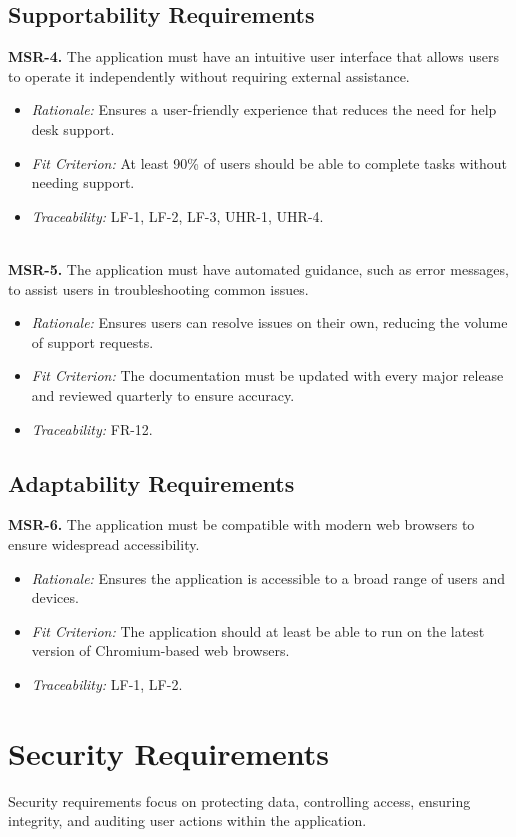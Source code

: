 \documentclass[12pt]{article}
\begin{document}
\subsection{Supportability Requirements}
\textbf{MSR-4.} The application must have an intuitive user interface that allows users to
  operate it independently without requiring external assistance.
  \begin{itemize}
    \item \textit{Rationale:} Ensures a user-friendly experience that reduces
    the need for help desk support.
    \item \textit{Fit Criterion:} At least 90\% of users should be able to
    complete tasks without needing support.
    \item \textit{Traceability:} LF-1, LF-2, LF-3, UHR-1, UHR-4.
  \end{itemize}
\ \\
\textbf{MSR-5.} The application must have automated guidance, such as
  error messages, to assist users in troubleshooting common issues.
  \begin{itemize}
    \item \textit{Rationale:} Ensures users can resolve issues on their own,
    reducing the volume of support requests.
    \item \textit{Fit Criterion:} The documentation must be updated with every
    major release and reviewed quarterly to ensure accuracy.
    \item \textit{Traceability:} FR-12.
  \end{itemize}

\subsection{Adaptability Requirements}
\textbf{MSR-6.} The application must be compatible with modern web
  browsers to ensure widespread accessibility.
  \begin{itemize}
    \item \textit{Rationale:} Ensures the application is accessible to a broad
    range of users and devices.
    \item \textit{Fit Criterion:} The application should at least be able to run
    on the latest version of Chromium-based web browsers.
    \item \textit{Traceability:} LF-1, LF-2.
  \end{itemize}

\section{Security Requirements}
Security requirements focus on protecting data, controlling access, ensuring
integrity, and auditing user actions within the application.
\end{document}
